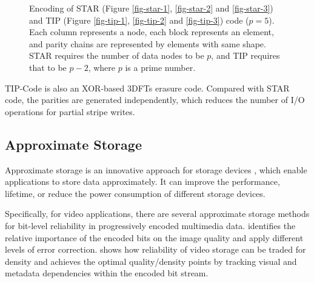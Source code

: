 \documentclass[sigconf]{acmart}
\begin{document}
\begin{figure}[!ht]
{}
\vspace{-3mm}
\hspace{5pt}
\vspace{-3mm}
\caption{\small{Encoding of STAR (Figure \ref{fig-star-1}, \ref{fig-star-2} and \ref{fig-star-3}) and TIP (Figure \ref{fig-tip-1}, \ref{fig-tip-2} and \ref{fig-tip-3}) code ($p = 5$). Each column represents a node, each block represents an element, and parity chains are represented by elements with same shape. STAR requires the number of data nodes to be $p$, and TIP requires that to be $p-2$, where $p$ is a prime number.}}
\vspace{-3mm}
\label{fig-star-tip}
\end{figure}

TIP-Code is also an XOR-based 3DFTs erasure code.
Compared with STAR code, the parities are generated independently, which reduces the number of I/O operations for partial stripe writes.

\subsection{Approximate Storage}
Approximate storage is an innovative approach for storage devices \cite{zhao2017approximate, sampson2014approximate, guo2016high, jevdjic2017approximate}, which enable applications to store data approximately. It can improve the performance, lifetime, or reduce the power consumption of different storage devices.

Specifically, for video applications, there are several approximate storage methods \cite{guo2016high, jevdjic2017approximate} for bit-level reliability in progressively encoded multimedia data.  \cite{guo2016high} identifies the relative importance of the encoded bits on the image quality and apply different levels of error correction. \cite{jevdjic2017approximate} shows how reliability of video storage can be traded for density and achieves the optimal quality/density points by tracking visual and metadata dependencies within the encoded bit stream.
\end{document}

